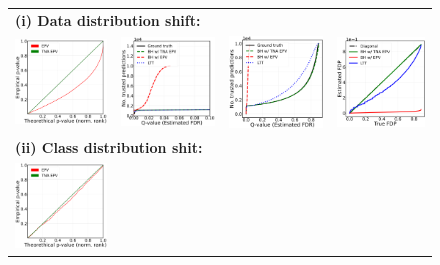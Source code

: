 \documentclass{article}
\begin{document}
\begin{figure}[h!]
	\centering
	\begin{tabular}{cccc}
		\multicolumn{4}{l}{\bf (i) Data distribution shift:}\\
		\includegraphics[width=1.66in]{img/cnn_QQ_intensity_down.png}&
		\includegraphics[width=1.72in]{img/cnn_intensity_down_fdr_control_loc.png} &
		\includegraphics[width=1.7in]{img/cnn_intensity_down_fdr_control.png} & 
		\includegraphics[width=1.59in]{img/cnn_FDPscat_intensity_down.png} \\
		\multicolumn{4}{l}{\bf (ii) Class distribution shit:}\\
		\includegraphics[width=1.66in]{img/cnn_QQ_balanced.png}&

\end{tabular}
\end{figure}
\end{document}
